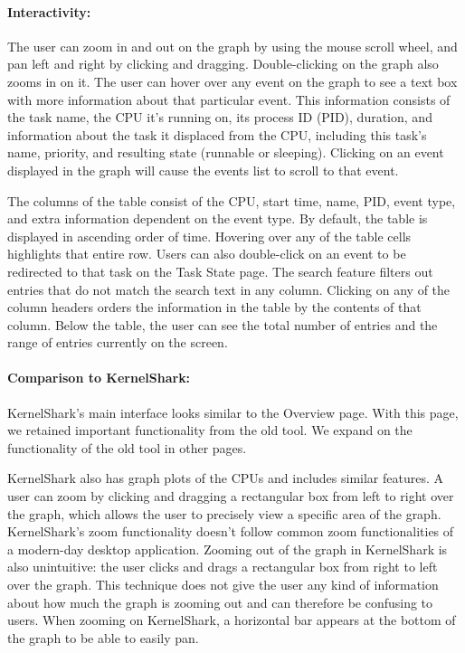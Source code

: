 \documentclass{hmcclinic}
\begin{document}
\paragraph{Interactivity:} The user can zoom in and out on the graph by using
the mouse scroll wheel, and pan left and right by clicking and dragging.
Double-clicking on the graph also zooms in on it. The user can hover over any
event on the graph to see a text box with more information about that particular
event.  This information consists of the task name, the CPU it's running on, its
process ID (PID), duration, and information about the task it displaced from the
CPU, including this task's name, priority, and resulting state (runnable or
sleeping). Clicking on an event displayed in the graph will cause the
events list to scroll to that event.

The columns of the table consist of the CPU, start time, name, PID, event type,
and extra information dependent on the event type. By default, the table is
displayed in ascending order of time.  Hovering over any of the table cells
highlights that entire row. Users can also double-click on an event to be
redirected to that task on the Task State page.  The search feature filters out
entries that do not match the search text in any column.  Clicking on any of the
column headers orders the information in the table by the contents of that
column.  Below the table, the user can see the total number of entries and the
range of entries currently on the screen.

\paragraph{Comparison to KernelShark:} 
  KernelShark's main interface looks similar to the Overview page.  With this
  page, we retained important functionality from the old tool. We expand on the
  functionality of the old tool in other pages.

  KernelShark also has graph plots of the CPUs and includes similar features. A
  user can zoom by clicking and dragging a rectangular box from left to right
  over the graph, which allows the user to precisely view a specific area of the
  graph.  KernelShark's zoom functionality doesn't follow common zoom functionalities of
  a modern-day desktop application. Zooming out of the graph in KernelShark is
  also unintuitive: the user clicks and drags a rectangular box from right to
  left over the graph. This technique does not give the user any kind of
  information about how much the graph is zooming out and can therefore be
  confusing to users. When zooming on KernelShark, a horizontal bar appears at
  the bottom of the graph to be able to easily pan.
    
\end{document}
